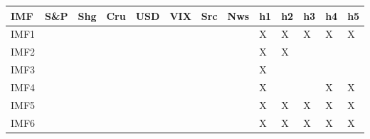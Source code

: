 {\tiny\setlength{\tabcolsep}{1pt}\begin{tabular}{lllllllllllll} \toprule
IMF & S\&P & Shg & Cru & USD & VIX & Src & Nws & h1 & h2 & h3 & h4 & h5 \\ \midrule
IMF1 & & & & & & & & X & X & X & X & X \\ 
IMF2 & & & & & & & & X & X & & & \\ 
IMF3 & & & & & & & & X & & & & \\ 
IMF4 & & & & & & & & X & & & X & X \\ 
IMF5 & & & & & & & & X & X & X & X & X \\ 
IMF6 & & & & & & & & X & X & X & X & X \\ 
\bottomrule \end{tabular}}
